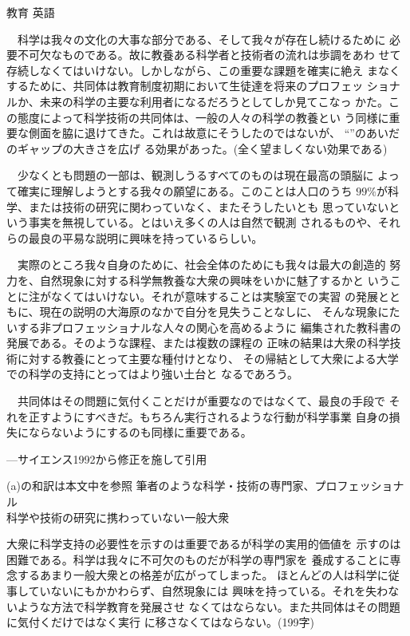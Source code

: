 \documentclass[fleqn]{jbook}
\begin{document}
\begin{answer}{教育 英語}{}
\begin{subanswers}
  　科学は我々の文化の大事な部分である、そして我々が存在し続けるために
  必要不可欠なものである。故に教養ある科学者と技術者の流れは歩調をあわ
  せて存続しなくてはいけない。しかしながら、この重要な課題を確実に絶え
  まなくするために、共同体は教育制度初期において生徒達を将来のプロフェッ
  ショナルか、未来の科学の主要な利用者になるだろうとしてしか見てこなっ
  かた。この態度によって科学技術の共同体は、一般の人々の科学の教養とい
  う同様に重要な側面を脇に退けてきた。これは故意にそうしたのではないが、
  ``''のあいだのギャップの大きさを広げ
  る効果があった。(全く望ましくない効果である)

  　少なくとも問題の一部は、観測しうるすべてのものは現在最高の頭脳に
  よって確実に理解しようとする我々の願望にある。このことは人口のうち
  $99\%$が科学、または技術の研究に関わっていなく、またそうしたいとも
  思っていないという事実を無視している。とはいえ多くの人は自然で観測
  されるものや、それらの最良の平易な説明に興味を持っているらしい。

  　実際のところ我々自身のために、社会全体のためにも我々は最大の創造的
  努力を、自然現象に対する科学無教養な大衆の興味をいかに魅了するかと
  いうことに注がなくてはいけない。それが意味することは実験室での実習
  の発展とともに、現在の説明の大海原のなかで自分を見失うことなしに、
  そんな現象にたいする非プロフェッショナルな人々の関心を高めるように
  編集された教科書の発展である。そのような課程、または複数の課程の
  正味の結果は大衆の科学技術に対する教養にとって主要な種付けとなり、
  その帰結として大衆による大学での科学の支持にとってはより強い土台と
  なるであろう。

  　共同体はその問題に気付くことだけが重要なのではなくて、最良の手段で
  それを正すようにすべきだ。もちろん実行されるような行動が科学事業
  自身の損失にならないようにするのも同様に重要である。
%
  \begin{flushright}
    ---サイエンス1992から修正を施して引用
  \end{flushright}

  \begin{subsubanswers}
  \SubSubAnswer
    (a)の和訳は本文中を参照
  \SubSubAnswer
      筆者のような科学・技術の専門家、プロフェッショナル\\
      科学や技術の研究に携わっていない一般大衆

  \SubSubAnswer
    大衆に科学支持の必要性を示すのは重要であるが科学の実用的価値を
    示すのは困難である。科学は我々に不可欠のものだが科学の専門家を
    養成することに専念するあまり一般大衆との格差が広がってしまった。
    ほとんどの人は科学に従事していないにもかかわらず、自然現象には
    興味を持っている。それを失わないような方法で科学教育を発展させ
    なくてはならない。また共同体はその問題に気付くだけではなく実行
    に移さなくてはならない。(199字)


\end{subsubanswers}
\end{subanswers}
\end{answer}
\end{document}
